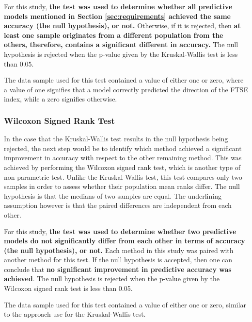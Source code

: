 \documentclass{UoYCSproject}
\begin{document}
For this study, \textbf{the test was used to determine whether all predictive models mentioned in Section \ref{sec:requirements} achieved the same accuracy (the null hypothesis), or not.}  Otherwise, if it is rejected, then \textbf{at least one sample originates from a different population from the others, therefore, contains a significant different in accuracy.} The null hypothesis is rejected when the p-value given by the Kruskal-Wallis test is less than $0.05$.

The data sample used for this test contained a value of either one or zero, where a value of one signifies that a model correctly predicted the direction of the FTSE index, while a zero signifies otherwise.
 

\subsubsection{Wilcoxon Signed Rank Test} 
\label{sec:wilcoxon}
In the case that the Kruskal-Wallis test results in the null hypothesis being rejected, the next step would be to identify which method achieved a significant improvement in accuracy with respect to the other remaining method. This was achieved by performing the Wilcoxon signed rank test, which is another type of non-parametric test. Unlike the Kruskal-Wallis test, this test compares only two samples in order to assess whether their population mean ranks differ. The null hypothesis is that the medians of two samples are equal. The underlining assumption however is that the paired differences are independent from each other.

For this study, \textbf{the test was used to determine whether two predictive models do not significantly differ from each other in terms of accuracy (the null hypothesis), or not.} Each method in this study was paired with another method for this test. If the null hypothesis is accepted, then one can conclude that \textbf{no significant improvement in predictive accuracy was achieved}. The null hypothesis is rejected when the p-value given by the Wilcoxon signed rank test is less than 0.05.

The data sample used for this test contained a value of either one or zero, similar to the approach use for the Kruskal-Wallis test.
\end{document}
